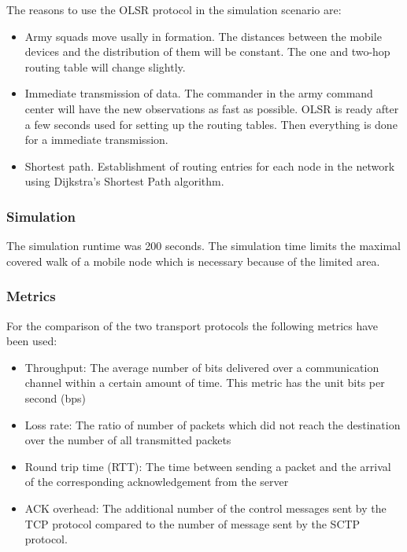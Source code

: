 \documentclass[a4paper]{article}
\begin{document}
The reasons to use the OLSR protocol in the simulation scenario are:
\begin{itemize}
	\item Army squads move usally in formation. The distances between the mobile devices and the distribution of them will be constant. The one and two-hop routing table will change slightly.
	\item Immediate transmission of data. The commander in the army command center will have the new observations as fast as possible. OLSR is ready after a few seconds used for setting up the routing tables. Then everything is done for a immediate transmission.
	\item Shortest path. Establishment of routing entries for each node in the network using Dijkstra's Shortest Path algorithm.
\end{itemize}


\subsubsection{Simulation}
The simulation runtime was 200 seconds. The simulation time limits the maximal covered walk of a mobile node which is necessary because of the limited area.
\subsubsection{Metrics}
For the comparison of the two transport protocols the following metrics have been used:
\begin{itemize}
	\item Throughput: The average number of bits delivered over a communication channel within a certain amount of time. This metric has the unit bits per second (bps)
	\item Loss rate: The ratio of number of packets which did not reach the destination over the number of all transmitted packets
	\item Round trip time (RTT): The time between sending a packet and the arrival of the corresponding acknowledgement from the server
	\item ACK overhead: The additional number of the control messages sent by the TCP protocol compared to the number of message sent by the SCTP protocol.
\end{itemize}			
\end{document}

